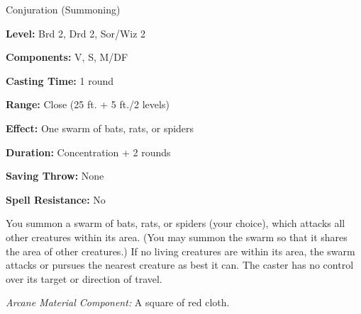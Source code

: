 
Conjuration (Summoning)

\textbf{Level:} Brd 2, Drd 2, Sor/Wiz 2

\textbf{Components:} V, S, M/DF

\textbf{Casting Time:} 1 round

\textbf{Range:} Close (25 ft. + 5 ft./2 levels)

\textbf{Effect:} One swarm of bats, rats, or spiders

\textbf{Duration:} Concentration + 2 rounds

\textbf{Saving Throw:} None

\textbf{Spell Resistance:} No

You summon a swarm of bats, rats, or spiders (your choice), which attacks all other 
creatures within its area. (You may summon the swarm so that it shares the area 
of other creatures.) If no living creatures are within its area, the swarm attacks 
or pursues the nearest creature as best it can. The caster has no control over 
its target or direction of travel.

\textit{Arcane Material Component:} A square of red cloth.

